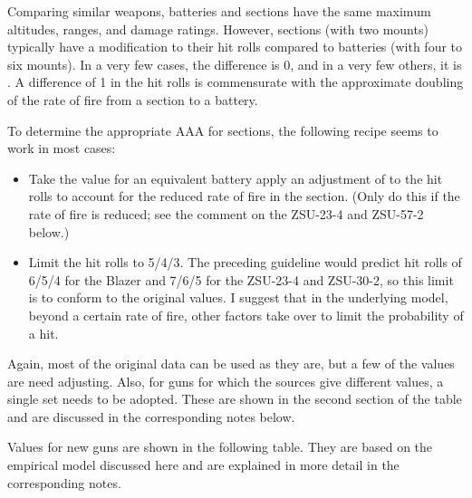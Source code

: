 {    Comparing similar weapons, batteries and sections have the same maximum altitudes, ranges, and damage ratings.
    However, sections (with two mounts) typically have a  modification to their hit rolls compared to batteries (with four to six mounts).
    In a very few cases, the difference is 0, and in a very few others, it is .
    A difference of 1 in the hit rolls is commensurate with the approximate doubling of the rate of fire from a section to a battery.

    To determine the appropriate AAA for sections, the following recipe seems to work in most cases:
    \begin{itemize}
        \item Take the value for an equivalent battery apply an adjustment of  to the hit rolls to account for the reduced rate of fire in the section. (Only do this if the rate of fire is reduced; see the comment on the ZSU-23-4 and ZSU-57-2 below.)
        \item Limit the hit rolls to 5/4/3. The preceding guideline would predict hit rolls of 6/5/4 for the Blazer and 7/6/5 for the ZSU-23-4 and ZSU-30-2, so this limit is to conform to the original values. I suggest that in the underlying model, beyond a certain rate of fire, other factors take over to limit the probability of a hit.
    \end{itemize}

    Again, most of the original data can be used as they are, but a few of the values are need adjusting.
    Also, for guns for which the sources give different values, a single set needs to be adopted.
    These are shown in the second section of the table and are discussed in the corresponding notes below.

    Values for new guns are shown in the following table. They are based on the empirical model discussed here and are explained in more detail in the corresponding notes.

}
